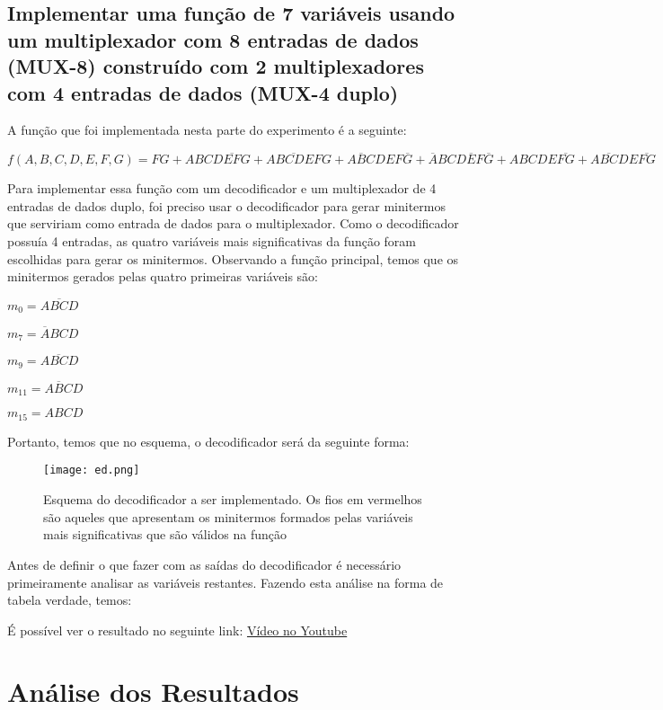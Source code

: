 \documentclass[12pt]{article}
\begin{document}
\subsection{Implementar uma função de 7 variáveis usando um multiplexador com 8 entradas de dados (MUX-8) construído com 2 multiplexadores com 4 entradas de dados (MUX-4 duplo)}
\label{sec:Demux}

A função que foi implementada nesta parte do experimento é a seguinte:

$f(A,B,C,D,E,F,G) = FG + ABCD\overline{EF}G + \overline{ABCDEF}G + A\overline{B}CDEF\overline{G} + \overline{A}BCD\overline{E}F\overline{G} + ABCDE\overline{FG} + A\overline{BC}DE\overline{FG}$

Para implementar essa função com um decodificador e um multiplexador de 4 entradas de dados duplo, foi preciso usar o decodificador para gerar minitermos que serviriam como entrada de dados para o multiplexador. Como o decodificador possuía 4 entradas, as quatro variáveis mais significativas da função foram escolhidas para gerar os minitermos. Observando a função principal, temos que os minitermos gerados pelas quatro primeiras variáveis são:

$m_{0}=\overline{ABCD}$

$m_{7}=\overline{A}BCD$

$m_{9}=A\overline{BC}D$

$m_{11}=A\overline{B}CD$

$m_{15}=ABCD$

Portanto, temos que no esquema, o decodificador será da seguinte forma: 

\begin{figure}[H]
	\centering
	\texttt{[image: ed.png]}
	\caption{Esquema do decodificador a ser implementado. Os fios em vermelhos são aqueles que apresentam os minitermos formados pelas variáveis mais significativas  que são válidos na função}
	\label{fig:edd}
\end{figure}

Antes de definir o que fazer com as saídas do decodificador é necessário primeiramente analisar as variáveis restantes. Fazendo esta análise na forma de tabela verdade, temos:


É possível ver o resultado no seguinte link: \href{https://youtu.be/T1X_-Ha7S-g}{Vídeo no Youtube}


\section{Análise dos Resultados}
\label{sec:Resultados}
\end{document}
